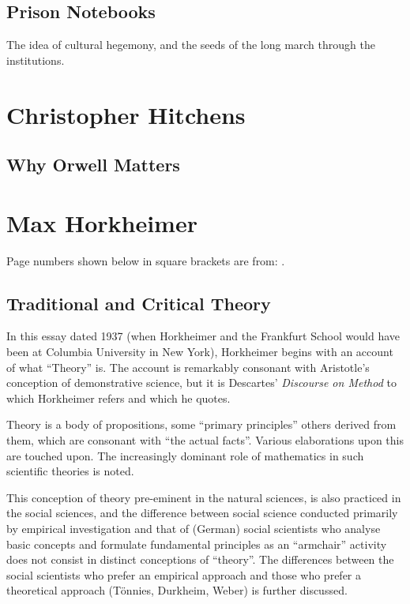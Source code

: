 \documentclass[10pt,titlepage]{book}
\begin{document}
\subsection{Prison Notebooks \cite{gramsci-notes}}

The idea of cultural hegemony, and the seeds of the long march through the institutions.

\section{Christopher Hitchens}

\subsection{Why Orwell Matters\cite{hitchens-wom}}

\section{Max Horkheimer}

Page numbers shown below in square brackets are from: \cite{horkheimer-crit}.

\subsection{Traditional and Critical Theory}

In this essay \cite{horkheimer-trad, horkheimer-crit} dated 1937 (when Horkheimer and the Frankfurt School would have been at Columbia University in New York), Horkheimer begins with an account of what ``Theory'' is.
The account is remarkably consonant with Aristotle's conception of demonstrative science, but it is Descartes' \emph{Discourse on Method}\cite{descartesDOM} to which Horkheimer refers and which he quotes.

Theory is a body of propositions, some ``primary principles'' others derived from them, which are consonant with ``the actual facts''.
Various elaborations upon this are touched upon.
The increasingly dominant role of mathematics in such scientific theories is noted.

This conception of theory pre-eminent in the natural sciences, is also practiced in the social sciences, and the difference between social science conducted primarily by empirical investigation and that of (German) social scientists who analyse basic concepts and formulate fundamental principles as an ``armchair'' activity does not consist in distinct conceptions of ``theory''.
The differences between the social scientists who prefer an empirical approach and those who prefer a theoretical approach (T\"{o}nnies, Durkheim, Weber) is further discussed.
\end{document}

